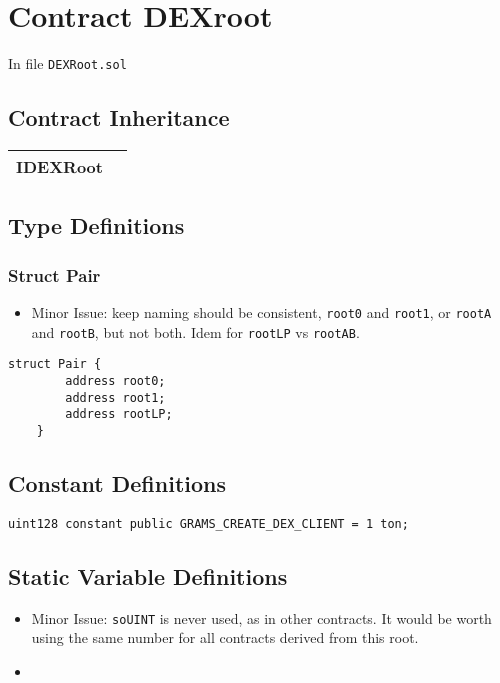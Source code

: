 
\chapter{Contract DEXroot}

\minitoc

In file {\tt DEXRoot.sol}

\section{Contract Inheritance}

\noindent\begin{tabular}{|l|p{5cm}|}\hline
IDEXRoot & \\\hline
\end{tabular}

\section{Type Definitions}

\subsection{Struct Pair}

\begin{itemize}
\item Minor Issue: keep naming should be consistent, {\tt root0} and
  {\tt root1}, or {\tt rootA} and {\tt rootB}, but not both. Idem for
  {\tt rootLP} vs {\tt rootAB}.
\end{itemize}

\begin{lstlisting}[firstnumber=24]
	struct Pair {
		address root0;
		address root1;
		address rootLP;
	}
\end{lstlisting}

\section{Constant Definitions}

\begin{lstlisting}[firstnumber=42]
	uint128 constant public GRAMS_CREATE_DEX_CLIENT = 1 ton;
\end{lstlisting}

\section{Static Variable Definitions}

\begin{itemize}
\item Minor Issue: {\tt soUINT} is never used, as in other
  contracts. It would be worth using the same number for all contracts
  derived from this root.
\item \issueStatic{}
\end{itemize}


